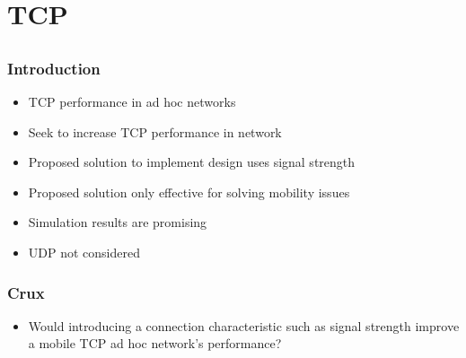 \section{TCP}
\subsection*{}


\begin{frame}[t]
  \frametitle{Introduction}
  \begin{itemize}
  \item TCP performance in ad hoc networks
  \item Seek to increase TCP performance in network
  \item Proposed solution to implement design uses signal strength
  \item Proposed solution only effective for solving mobility issues
  \item Simulation results are promising
  \item UDP not considered
  \end{itemize}

  \vfill

  \begin{flushleft}
    \begin{tiny}
      \begin{minipage}{1.0\linewidth}
      \end{minipage}
    \end{tiny}
  \end{flushleft}
  
\end{frame}

\begin{frame}[t]
  \frametitle{Crux}
  \begin{itemize}
  \item Would introducing a connection characteristic such as signal strength improve a mobile TCP ad hoc network’s performance?
  \end{itemize}

  \vfill

  \begin{flushleft}
    \begin{tiny}
      \begin{minipage}{1.0\linewidth}
      \end{minipage}
    \end{tiny}
  \end{flushleft}
  
\end{frame}

